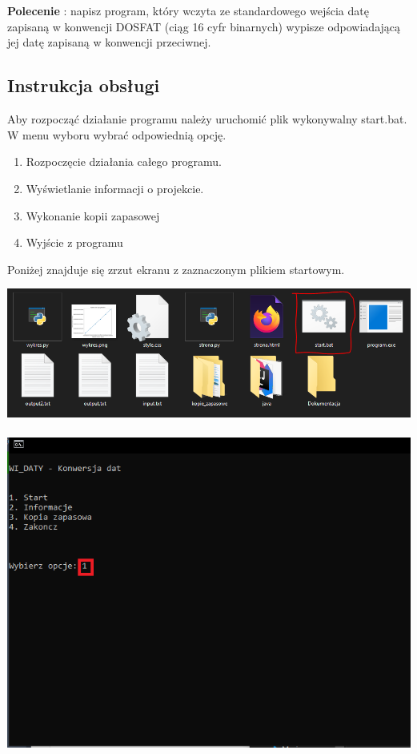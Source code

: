 \documentclass[12pt,a4paper]{article}
\begin{document}
	 \\
	\\ 	
  \textbf{Polecenie }: napisz program, który wczyta ze standardowego wejścia datę zapisaną w konwencji DOSFAT (ciąg 16 cyfr binarnych) wypisze odpowiadającą jej datę zapisaną w konwencji przeciwnej. 
	 

	\newpage\newpage
	\subsection*{Instrukcja obsługi}
	Aby rozpocząć działanie programu należy uruchomić plik wykonywalny start.bat. W menu wyboru wybrać odpowiednią opcję.
    
\begin{enumerate}
\item Rozpoczęcie działania całego programu.
\item Wyświetlanie informacji o projekcie.
\item Wykonanie kopii zapasowej
\item Wyjście z programu
\end{enumerate}
	
Poniżej znajduje się zrzut ekranu z zaznaczonym plikiem startowym.
		
			\includegraphics[scale=0.65]{instrukcja}
             	 \\
         	\\
			\includegraphics[scale=0.8]{instrukcja2}
\end{document}
